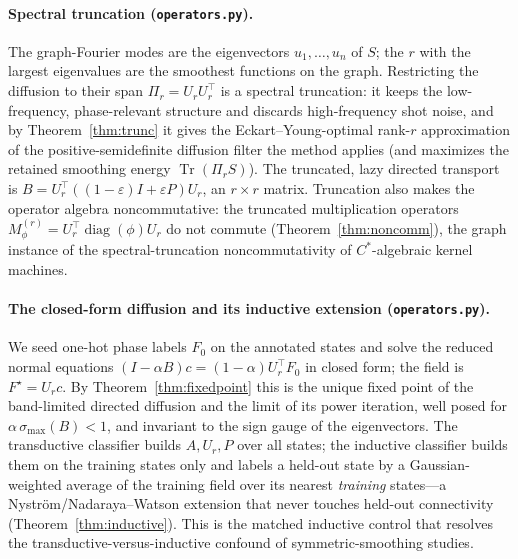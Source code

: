 \documentclass[aps,prresearch,reprint,amsmath,amssymb,nofootinbib,superscriptaddress,floatfix]{revtex4-2}
\theoremstyle{definition}
\theoremstyle{remark}
\theoremstyle{plain}
\begin{document}
\paragraph{Spectral truncation (\texttt{operators.py}).}
The graph-Fourier modes are the eigenvectors $u_1,\dots,u_n$ of $S$; the $r$ with the largest eigenvalues
are the smoothest functions on the graph. Restricting the diffusion to their span $\Pi_r=U_rU_r^\top$ is a
spectral truncation: it keeps the low-frequency, phase-relevant structure and discards high-frequency shot
noise, and by Theorem~\ref{thm:trunc} it gives the Eckart--Young-optimal rank-$r$ approximation of the
positive-semidefinite diffusion filter the method applies (and maximizes the retained smoothing energy
$\operatorname{Tr}(\Pi_r S)$). The truncated, lazy directed transport is
$B=U_r^\top((1-\varepsilon)I+\varepsilon P)U_r$, an $r\times r$ matrix. Truncation also makes the operator
algebra noncommutative: the truncated multiplication operators
$M_\phi^{(r)}=U_r^\top\operatorname{diag}(\phi)U_r$ do not commute (Theorem~\ref{thm:noncomm}), the graph
instance of the spectral-truncation noncommutativity of $C^*$-algebraic kernel machines.

\paragraph{The closed-form diffusion and its inductive extension (\texttt{operators.py}).}
We seed one-hot phase labels $F_0$ on the annotated states and solve the reduced normal equations
$(I-\alpha B)c=(1-\alpha)U_r^\top F_0$ in closed form; the field is $F^\star=U_rc$. By
Theorem~\ref{thm:fixedpoint} this is the unique fixed point of the band-limited directed diffusion and the
limit of its power iteration, well posed for $\alpha\,\sigma_{\max}(B)<1$, and invariant to the sign gauge
of the eigenvectors. The transductive classifier builds $A,U_r,P$ over all states; the inductive classifier
builds them on the training states only and labels a held-out state by a Gaussian-weighted average of the
training field over its nearest \emph{training} states---a Nystr\"om/Nadaraya--Watson extension that never
touches held-out connectivity (Theorem~\ref{thm:inductive}). This is the matched inductive control that
resolves the transductive-versus-inductive confound of symmetric-smoothing studies.
\end{document}
